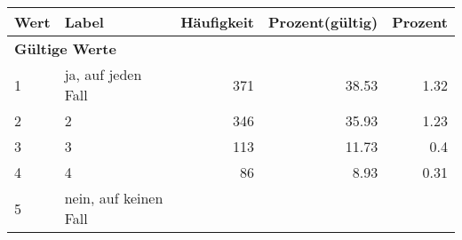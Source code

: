      \begin{longtable}{lXrrr}
     \toprule
     \textbf{Wert} & \textbf{Label} & \textbf{Häufigkeit} & \textbf{Prozent(gültig)} & \textbf{Prozent} \\
     \endhead
     \midrule
     \multicolumn{5}{l}{\textbf{Gültige Werte}}\\

     1 &
     \multicolumn{1}{X}{ ja, auf jeden Fall   } &


       \num{371} &
       \num[round-mode=places,round-precision=2]{38,53} &
         \num[round-mode=places,round-precision=2]{1,32} \\

     2 &
     \multicolumn{1}{X}{ 2   } &


       \num{346} &
       \num[round-mode=places,round-precision=2]{35,93} &
         \num[round-mode=places,round-precision=2]{1,23} \\

     3 &
     \multicolumn{1}{X}{ 3   } &


       \num{113} &
       \num[round-mode=places,round-precision=2]{11,73} &
         \num[round-mode=places,round-precision=2]{0,4} \\

     4 &
     \multicolumn{1}{X}{ 4   } &


       \num{86} &
       \num[round-mode=places,round-precision=2]{8,93} &
         \num[round-mode=places,round-precision=2]{0,31} \\

     5 &
     \multicolumn{1}{X}{ nein, auf keinen Fall   } &



\end{longtable}
